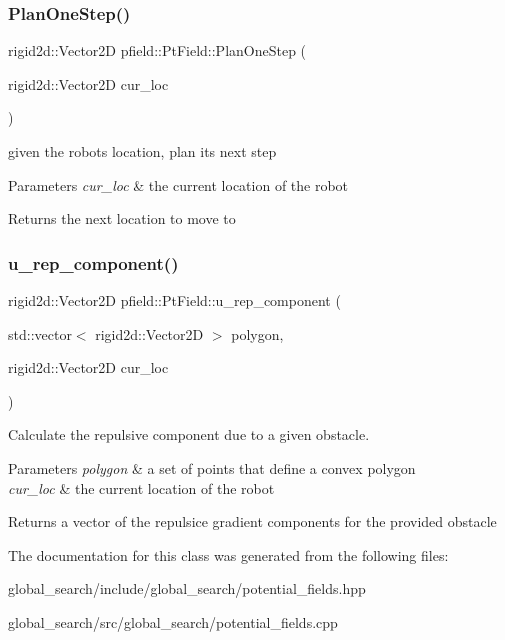 \subsubsection{\texorpdfstring{Plan\+One\+Step()}{PlanOneStep()}}
{\footnotesize\ttfamily rigid2d\+::\+Vector2D pfield\+::\+Pt\+Field\+::\+Plan\+One\+Step (\begin{DoxyParamCaption}\item[{rigid2d\+::\+Vector2D}]{cur\+\_\+loc }\end{DoxyParamCaption})}



given the robots location, plan its next step 


\begin{DoxyParams}{Parameters}
{\em cur\+\_\+loc} & the current location of the robot \\
\hline
\end{DoxyParams}
\begin{DoxyReturn}{Returns}
the next location to move to 
\end{DoxyReturn}
\mbox{\label{classpfield_1_1PtField_ac8e3ca79a5c7eb3baeaa4b6097df2c8f}} 
\subsubsection{\texorpdfstring{u\+\_\+rep\+\_\+component()}{u\_rep\_component()}}
{\footnotesize\ttfamily rigid2d\+::\+Vector2D pfield\+::\+Pt\+Field\+::u\+\_\+rep\+\_\+component (\begin{DoxyParamCaption}\item[{std\+::vector$<$ rigid2d\+::\+Vector2D $>$}]{polygon,  }\item[{rigid2d\+::\+Vector2D}]{cur\+\_\+loc }\end{DoxyParamCaption})\hspace{0.3cm}{\ttfamily [private]}}



Calculate the repulsive component due to a given obstacle. 


\begin{DoxyParams}{Parameters}
{\em polygon} & a set of points that define a convex polygon \\
\hline
{\em cur\+\_\+loc} & the current location of the robot \\
\hline
\end{DoxyParams}
\begin{DoxyReturn}{Returns}
a vector of the repulsice gradient components for the provided obstacle 
\end{DoxyReturn}


The documentation for this class was generated from the following files\+:\begin{DoxyCompactItemize}
\item 
global\+\_\+search/include/global\+\_\+search/potential\+\_\+fields.\+hpp\item 
global\+\_\+search/src/global\+\_\+search/potential\+\_\+fields.\+cpp\end{DoxyCompactItemize}
